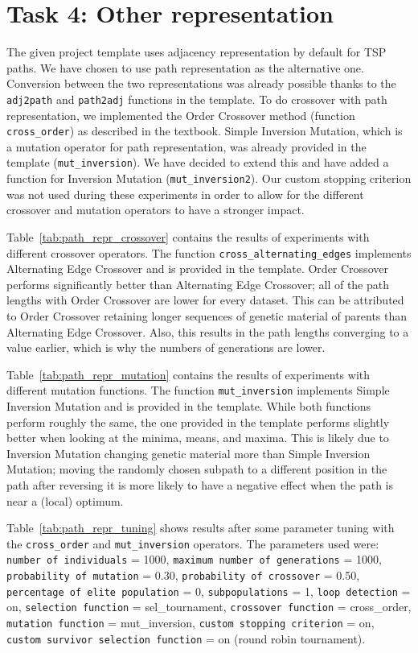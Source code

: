 \documentclass{report}
\begin{document}
\section{Task 4: Other representation}
The given project template uses adjacency representation by default for TSP paths. We have chosen to use path representation as the alternative one. Conversion between the two representations was already possible thanks to the \texttt{adj2path} and \texttt{path2adj} functions in the template. To do crossover with path representation, we implemented the Order Crossover method (function \texttt{cross\_order}) as described in the textbook. Simple Inversion Mutation, which is a mutation operator for path representation, was already provided in the template (\texttt{mut\_inversion}). We have decided to extend this and have added a function for Inversion Mutation (\texttt{mut\_inversion2}). Our custom stopping criterion was not used during these experiments in order to allow for the different crossover and mutation operators to have a stronger impact.

Table~\ref{tab:path_repr_crossover} contains the results of experiments with different crossover operators. The function \texttt{cross\_alternating\_edges} implements Alternating Edge Crossover and is provided in the template. Order Crossover performs significantly better than Alternating Edge Crossover; all of the path lengths with Order Crossover are lower for every dataset. This can be attributed to Order Crossover retaining longer sequences of genetic material of parents than Alternating Edge Crossover. Also, this results in the path lengths converging to a value earlier, which is why the numbers of generations are lower. 


Table~\ref{tab:path_repr_mutation} contains the results of experiments with different mutation functions. The function \texttt{mut\_inversion} implements Simple Inversion Mutation and is provided in the template. While both functions perform roughly the same, the one provided in the template performs slightly better when looking at the minima, means, and maxima. This is likely due to Inversion Mutation changing genetic material more than Simple Inversion Mutation; moving the randomly chosen subpath to a different position in the path after reversing it is more likely to have a negative effect when the path is near a (local) optimum. 



Table~\ref{tab:path_repr_tuning} shows results after some parameter tuning with the \texttt{cross\_order} and \texttt{mut\_inversion} operators. The parameters used were: \texttt{number of individuals} = 1000, \texttt{maximum number of generations} = 1000, \texttt{probability of mutation} = 0.30, \texttt{probability of crossover} = 0.50, \texttt{percentage of elite population} = 0, \texttt{subpopulations} = 1, \texttt{loop detection} = on, \texttt{selection function} = sel\_tournament, \texttt{crossover function} = cross\_order, \texttt{mutation function} = mut\_inversion, \texttt{custom stopping criterion} = on, \texttt{custom survivor selection function} = on (round robin tournament).

\end{document}
